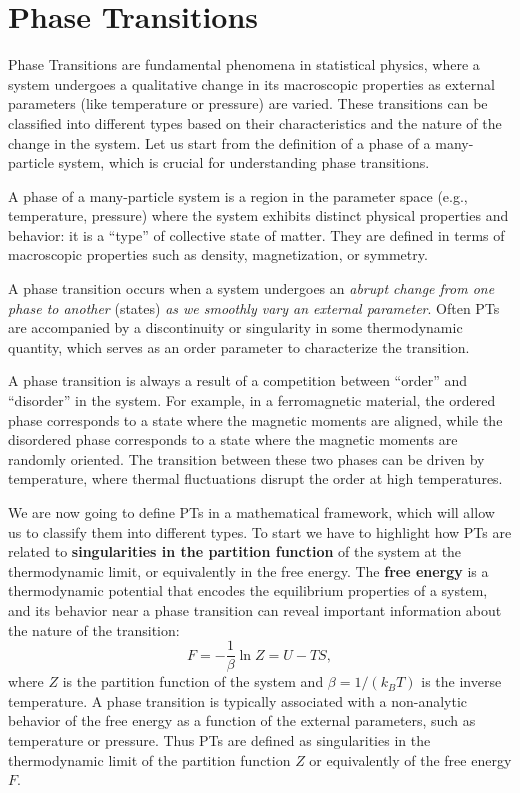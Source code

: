 \chapter{Phase Transitions}

Phase Transitions are fundamental phenomena in statistical physics, where a system undergoes a qualitative change in its macroscopic properties as external parameters (like temperature or pressure) are varied. These transitions can be classified into different types based on their characteristics and the nature of the change in the system. Let us start from the definition of a phase of a many-particle system, which is crucial for understanding phase transitions.

\begin{definition}
    A phase of a many-particle system is a region in the parameter space (e.g., temperature, pressure) where the system exhibits distinct physical properties and behavior: it is a ``type'' of collective state of matter. They are defined in terms of macroscopic properties such as density, magnetization, or symmetry.
\end{definition}

A phase transition occurs when a system undergoes an \textit{abrupt change from one phase to another} (states) \textit{as we smoothly vary an external parameter}. Often PTs are accompanied by a discontinuity or singularity in some thermodynamic quantity, which serves as an order parameter to characterize the transition.

A phase transition is always a result of a competition between ``order'' and ``disorder'' in the system. For example, in a ferromagnetic material, the ordered phase corresponds to a state where the magnetic moments are aligned, while the disordered phase corresponds to a state where the magnetic moments are randomly oriented. The transition between these two phases can be driven by temperature, where thermal fluctuations disrupt the order at high temperatures.

We are now going to define PTs in a mathematical framework, which will allow us to classify them into different types. To start we have to highlight how PTs are related to \textbf{singularities in the partition function} of the system at the thermodynamic limit, or equivalently in the free energy. The \textbf{free energy} is a thermodynamic potential that encodes the equilibrium properties of a system, and its behavior near a phase transition can reveal important information about the nature of the transition:
\[
    F = -\frac{1}{\beta} \ln Z = U - TS,
\]
where $Z$ is the partition function of the system and $\beta = 1/(k_B T)$ is the inverse temperature. A phase transition is typically associated with a non-analytic behavior of the free energy as a function of the external parameters, such as temperature or pressure. Thus PTs are defined as singularities in the thermodynamic limit of the partition function $Z$ or equivalently of the free energy $F$.

